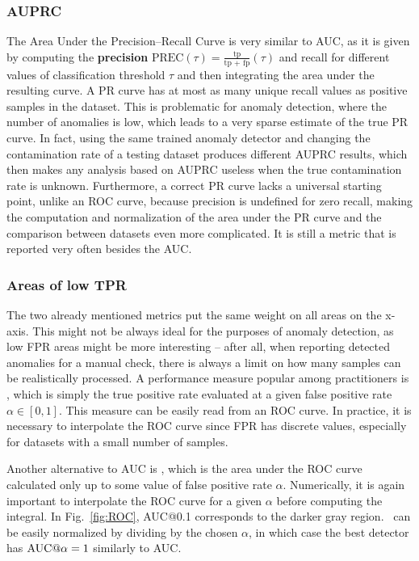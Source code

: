 \subsubsection{AUPRC}
The Area Under the Precision--Recall Curve is very similar to AUC, as it is given by computing the \textbf{precision} $\text{PREC}(\tau)=\frac{\text{tp}}{\text{tp + fp}}(\tau)$ and recall for different values of classification threshold $\tau$ and then integrating the area under the resulting curve. A PR curve has at most as many unique recall values as positive samples in the dataset. This is problematic for anomaly detection, where the number of anomalies is low, which leads to a very sparse estimate of the true PR curve. In fact, using the same trained anomaly detector and changing the contamination rate of a testing dataset produces different AUPRC results, which then makes any analysis based on AUPRC useless when the true contamination rate is unknown. Furthermore, a correct PR curve lacks a universal starting point, unlike an ROC curve, because precision is undefined for zero recall, making the computation and normalization of the area under the PR curve and the comparison between datasets even more complicated. It is still a metric that is reported very often besides the AUC.

\subsubsection{Areas of low TPR}
The two already mentioned metrics put the same weight on all areas on the x-axis. This might not be always ideal for the purposes of anomaly detection, as low FPR areas might be more interesting -- after all, when reporting detected anomalies for a manual check, there is always a limit on how many samples can be realistically processed. A performance measure popular among practitioners is \textbf{\tpra}, which is simply the true positive rate evaluated at a given false positive rate $\alpha \in [0,1]$. This measure can be easily read from an ROC curve. In practice, it is necessary to interpolate the ROC curve since FPR has discrete values, especially for datasets with a small number of samples. 

Another alternative to AUC is \textbf{\auca}, which is the area under the ROC curve calculated only up to some value of false positive rate $\alpha$. Numerically, it is again important to interpolate the ROC curve for a given $\alpha$ before computing the integral. In Fig.~\ref{fig:ROC}, AUC@0.1 corresponds to the darker gray region. \auca\ can be easily normalized by dividing by the chosen $\alpha$, in which case the best detector has $\textrm{AUC@}\alpha = 1$ similarly to AUC.

